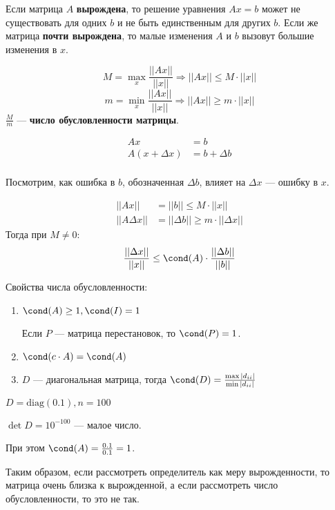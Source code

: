 Если матрица \(A\) \textbf{вырождена}, то решение уравнения \(Ax = b\) может не существовать для одних \(b\) и не быть единственным для других \(b\). Если же матрица \textbf{почти вырождена}, то малые изменения \(A\) и \(b\) вызовут большие изменения в \(x\).

\begin{definition}
    \[M = \max_x \frac{||Ax||}{||x||} \Rightarrow ||Ax|| \leq M \cdot ||x||\]
    \[m = \min_x \frac{||Ax||}{||x||} \Rightarrow ||Ax|| \geq m \cdot ||x||\]
    \(\frac{M}{m}\) --- \textbf{число обусловленности матрицы}.
\end{definition}

\begin{align}
    Ax              & = b            \\
    A(x + \Delta x) & = b + \Delta b \\
\end{align}

Посмотрим, как ошибка в \(b\), обозначенная \(\Delta b\), влияет на \(\Delta x\) --- ошибку в \(x\).

\begin{align*}
    ||Ax||          & = ||b|| \leq M \cdot ||x||                \\
    ||A \Delta x || & =  ||\Delta b|| \geq m \cdot ||\Delta x||
\end{align*}
Тогда при \(M \neq 0\):
\[\frac{||\Delta x||}{||x||} \leq \cond(A) \cdot \frac{||\Delta b||}{||b||}\]

Свойства числа обусловленности:
\begin{enumerate}
    \item \(\cond(A) \geq 1, \cond(I) = 1\)

          Если \(P\) --- матрица перестановок, то \(\cond(P) = 1\).

    \item \(\cond(c \cdot A) = \cond(A)\)
    \item \(D\) --- диагональная матрица, тогда \(\cond(D) = \frac{\max |d_{ii}|}{\min |d_{ii}|}\)
\end{enumerate}

\begin{example}
    \(D = \text{diag}(0.1), n = 100\)

    \(\det D = 10^{ - 100}\) --- малое число.

    При этом \(\cond(A) = \frac{0.1}{0.1} = 1\).

    Таким образом, если рассмотреть определитель как меру вырожденности, то матрица очень близка к вырожденной, а если рассмотреть число обусловленности, то это не так.
\end{example}

\unfinished
